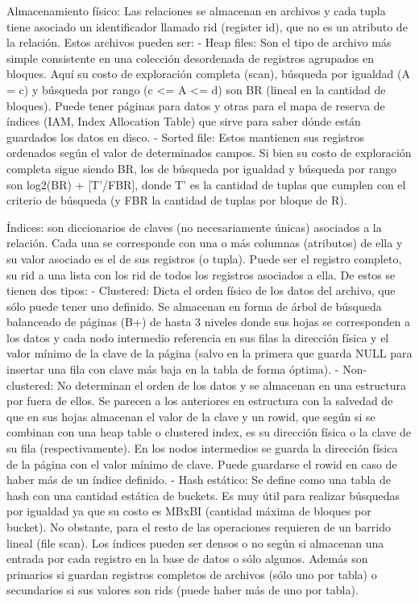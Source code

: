 Almacenamiento físico:
Las relaciones se almacenan en archivos y cada tupla tiene asociado un identificador llamado rid (register id), que no es un atributo de la relación. Estos archivos pueden ser:
- Heap files: Son el tipo de archivo más simple consistente en una colección desordenada de registros agrupados en bloques. Aquí su costo de exploración completa (scan), búsqueda por igualdad (A = c) y búsqueda por rango (c <= A <= d) son BR (lineal en la cantidad de bloques). Puede tener páginas para datos y otras para el mapa de reserva de índices (IAM, Index Allocation Table) que sirve para saber dónde están guardados los datos en disco.
- Sorted file: Estos mantienen sus registros ordenados según el valor de determinados campos. Si bien su costo de exploración completa sigue siendo BR, los de búsqueda por igualdad y búsqueda por rango son log2(BR) + [T'/FBR], donde T' es la cantidad de tuplas que cumplen con el criterio de búsqueda (y FBR la cantidad de tuplas por bloque de R).

Índices: son diccionarios de claves (no necesariamente únicas) asociados a la relación. Cada una se corresponde con una o más columnas (atributos) de ella y su valor asociado es el de sus registros (o tupla). Puede ser el registro completo, su rid a una lista con los rid de todos los registros asociados a ella.
De estos se tienen dos tipos:
- Clustered: Dicta el orden físico de los datos del archivo, que sólo puede tener uno definido. Se almacenan en forma de árbol de búsqueda balanceado de páginas (B+) de hasta 3 niveles donde sus hojas se corresponden a los datos y cada nodo intermedio referencia en sus filas la dirección física y el valor mínimo de la clave de la página (salvo en la primera que guarda NULL para insertar una fila con clave más baja en la tabla de forma óptima).
- Non-clustered: No determinan el orden de los datos y se almacenan en una estructura por fuera de ellos. Se parecen a los anteriores en estructura con la salvedad de que en sus hojas almacenan el valor de la clave y un rowid, que según si se combinan con una heap table o clustered index, es su dirección física o la clave de su fila (respectivamente). En los nodos intermedios se guarda la dirección física de la página con el valor mínimo de clave. Puede guardarse el rowid en caso de haber más de un índice definido.
- Hash estático: Se define como una tabla de hash con una cantidad estática de buckets. Es muy útil para realizar búsquedas por igualdad ya que su costo es MBxBI (cantidad máxima de bloques por bucket). No obstante, para el resto de las operaciones requieren de un barrido lineal (file scan).
Los índices pueden ser densos o no según si almacenan una entrada por cada registro en la base de datos o sólo algunos. Además son primarios si guardan registros completos de archivos (sólo uno por tabla) o secundarios si sus valores son rids (puede haber más de uno por tabla).

